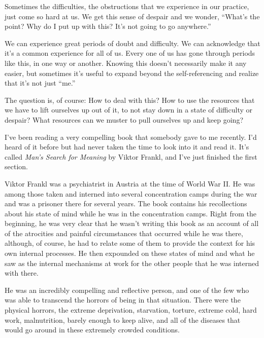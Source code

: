 Sometimes the difficulties, the obstructions that we experience in our practice, just come so hard at us. We get this sense of despair and we wonder, ``What's the point? Why do I put up with this? It's not going to go anywhere.''

We can experience great periods of doubt and difficulty. We can acknowledge that it's a common experience for all of us. Every one of us has gone through periods like this, in one way or another. Knowing this doesn't necessarily make it any easier, but sometimes it's useful to expand beyond the self-referencing and realize that it's not just ``me.''

The question is, of course: How to deal with this? How to use the resources that we have to lift ourselves up out of it, to not stay down in a state of difficulty or despair? What resources can we muster to pull ourselves up and keep going?

I've been reading a very compelling book that somebody gave to me recently. I'd heard of it before but had never taken the time to look into it and read it. It's called \emph{Man's Search for Meaning} by Viktor Frankl, and I've just finished \linebreak the first section.

Viktor Frankl was a psychiatrist in Austria at the time of World War II. He was among those taken and interned into several concentration camps during the war and was a prisoner there for several years. The book contains his recollections about his state of mind while he was in the concentration camps. Right from the beginning, he was very clear that he wasn't writing this book as an account of all of the atrocities and painful circumstances that occurred while he was there, although, of course, he had to relate some of them to provide the context for his own internal processes. He then expounded on these states of mind and what he saw as the internal mechanisms at work for the other people that he was interned with there.

He was an incredibly compelling and reflective person, and one of the few who was able to transcend the horrors of being in that situation. There were the physical horrors, the extreme deprivation, starvation, torture, extreme cold, hard work, malnutrition, barely enough to keep alive, and all of the diseases that would go around in these extremely crowded conditions.

